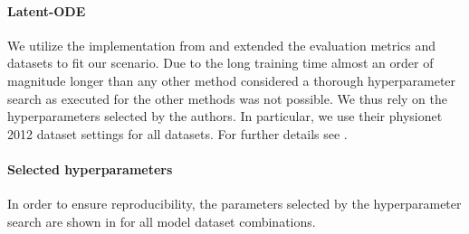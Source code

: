 \documentclass{article}
\begin{document}
\paragraph{Latent-ODE}
We utilize the implementation from \citet{rubanova2019latent} and extended the
evaluation metrics and datasets to fit our scenario.
Due to the long training time almost an order of magnitude longer than any
other method considered a thorough hyperparameter search as executed for the
other methods was not possible.  We thus rely on the hyperparameters selected
by the authors. In particular, we use their physionet 2012 dataset settings for
all datasets.
For further details see .

\paragraph{Selected hyperparameters}
In order to ensure reproducibility, the parameters selected by the
hyperparameter search are shown in  for
all model dataset combinations.
\end{document}
